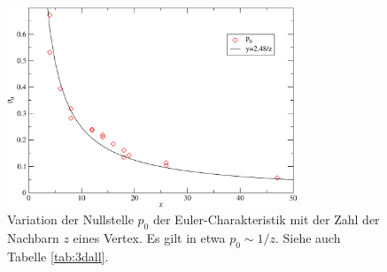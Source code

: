 \begin{figure}[htbp]
  \centering
  \includegraphics[height=6cm]{./Schranken-figs/pooverz_fig}
  \caption{Variation der Nullstelle $p_0$ der Euler-Charakteristik mit der Zahl der Nachbarn $z$ eines Vertex. Es gilt in etwa $p_0\sim 1/z$. Siehe auch Tabelle \ref{tab:3dall}. }
 \label{fig:pooverz}
\end{figure}

